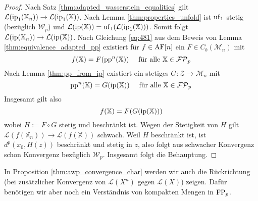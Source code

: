     \begin{proof}
        Nach Satz \ref{thm:adapted_wasserstein_equalities} gilt $\mathcal{L}(\operatorname{ip}_1(\mathbb{X}_n)) \rightarrow \mathcal{L}(\operatorname{ip}_1(\mathbb{X}))$. Nach Lemma \ref{thm:properties_unfold} ist $\operatorname{uf}_1$ stetig (bezüglich $\mathcal{W}_p$) und $\mathcal{L}(\operatorname{ip}(\mathbb{X})) = \operatorname{uf}_1(\mathcal{L}(\operatorname{ip}_1(\mathbb{X})))$. Somit folgt $\mathcal{L}(\operatorname{ip}(\mathbb{X}_n)) \rightarrow \mathcal{L}(\operatorname{ip}(\mathbb{X}))$. Nach Gleichung \ref{eq:481} aus dem Beweis von Lemma \ref{thm:equivalence_adapted_pp} existiert für $f \in \operatorname{AF}[n]$ ein $F \in C_b(\mathcal{M}_n)$ mit 
        $$f(\mathbb{X}) = F(\operatorname{pp}^n(\mathbb{X})) \quad \text{ für alle } \mathbb{X} \in \mathcal{FP}_p$$
        Nach Lemma \ref{thm:pp_from_ip} existiert ein stetiges $G: \mathcal{Z}\rightarrow \mathcal{M}_n$ mit 
        $$\operatorname{pp}^n(\mathbb{X}) = G(\operatorname{ip}(\mathbb{X})) \quad \text{ für alle } \mathbb{X} \in \mathcal{FP}_p$$
        Insgesamt  gilt also
        $$f(\mathbb{X}) = F(G(\operatorname{ip}(\mathbb{X})))$$
        wobei $H:=F\circ G$ stetig und beschränkt ist. Wegen der Stetigkeit von $H$ gilt $\mathcal{L}(f(\mathbb{X}_n)) \rightarrow \mathcal{L}(f(\mathbb{X}))$ schwach. Weil $H$ beschränkt ist, ist $d^p(x_0, H(z))$ beschränkt und stetig in $z$, also folgt aus schwacher Konvergenz schon Konvergenz bezüglich $\mathcal{W}_p$. Insgesamt folgt die Behauptung. 
    \end{proof}
    In Proposition \ref{thm:awp_convergence_char} werden wir auch die Rückrichtung (bei zusätzlicher Konvergenz von $\mathcal{L}(X^n)$ gegen $\mathcal{L}(X)$) zeigen. Dafür benötigen wir aber noch ein Verständnis von kompakten Mengen in $\operatorname{FP}_p$.
